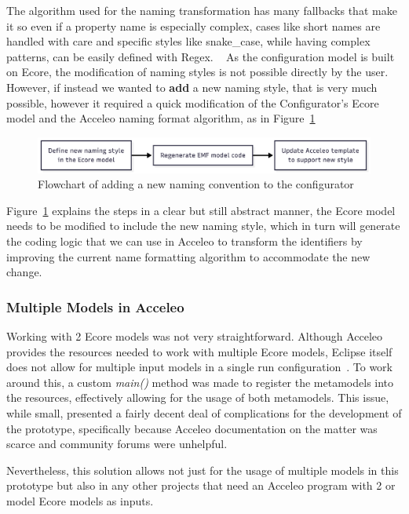 The algorithm used for the naming transformation has many fallbacks that make it so even if a property name is especially complex, cases like short names are handled with care and specific styles like snake\_case, while having complex patterns, can be easily defined with Regex. 
~\cite{eclipse_emf}
As the configuration model is built on Ecore, the modification of naming styles is not possible directly by the user. However, if instead we wanted to \textbf{add} a new naming style, that is very much possible, however it required a quick modification of the Configurator's Ecore model and the Acceleo naming format algorithm, as in Figure~\ref{fig:prototype_new_naming}

\begin{figure}[htbp]
	\centering
	\includegraphics[height=0.10\textwidth]{newNamingConvention.png}
	\caption{Flowchart of adding a new naming convention to the configurator}
	\label{fig:prototype_new_naming}
\end{figure}

Figure~\ref{fig:prototype_new_naming} explains the steps in a clear but still abstract manner, the Ecore model needs to be modified to include the new naming style, which in turn will generate the coding logic that we can use in Acceleo to transform the identifiers by improving the current name formatting algorithm to accommodate the new change.

\subsubsection{Multiple Models in Acceleo}

Working with 2 Ecore models was not very straightforward. Although Acceleo provides the resources needed to work with multiple Ecore models, Eclipse itself does not allow for multiple input models in a single run configuration~\cite{acceleo_multi_model_problem}. To work around this, a custom \textit{main()} method was made to register the metamodels into the resources, effectively allowing for the usage of both metamodels. This issue, while small, presented a fairly decent deal of complications for the development of the prototype, specifically because Acceleo documentation on the matter was scarce and community forums were unhelpful.

Nevertheless, this solution allows not just for the usage of multiple models in this prototype but also in any other projects that need an Acceleo program with 2 or model Ecore models as inputs.


